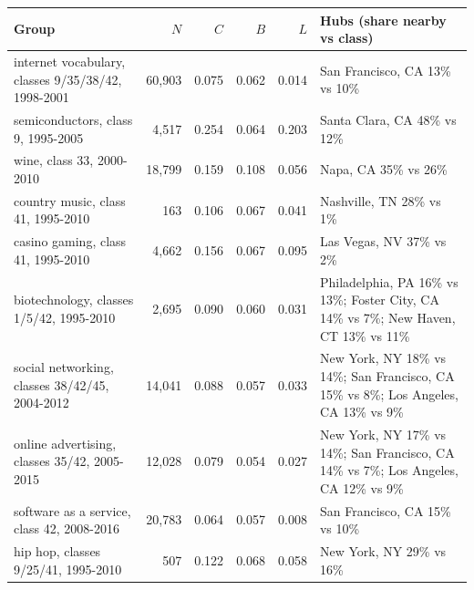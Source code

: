 {\small\begin{longtable}{>{\raggedright\arraybackslash}p{5.2cm}rrrr>{\raggedright\arraybackslash}p{4.6cm}}
\toprule Group & $N$ & $C$ & $B$ & $L$ & Hubs (share nearby vs class) \\ \midrule \endhead
internet vocabulary, classes 9/35/38/42, 1998-2001 & 60,903 & 0.075 & 0.062 & 0.014 & San Francisco, CA 13\% vs 10\% \\
semiconductors, class 9, 1995-2005 & 4,517 & 0.254 & 0.064 & 0.203 & Santa Clara, CA 48\% vs 12\% \\
wine, class 33, 2000-2010 & 18,799 & 0.159 & 0.108 & 0.056 & Napa, CA 35\% vs 26\% \\
country music, class 41, 1995-2010 & 163 & 0.106 & 0.067 & 0.041 & Nashville, TN 28\% vs 1\% \\
casino gaming, class 41, 1995-2010 & 4,662 & 0.156 & 0.067 & 0.095 & Las Vegas, NV 37\% vs 2\% \\
biotechnology, classes 1/5/42, 1995-2010 & 2,695 & 0.090 & 0.060 & 0.031 & Philadelphia, PA 16\% vs 13\%; Foster City, CA 14\% vs 7\%; New Haven, CT 13\% vs 11\% \\
social networking, classes 38/42/45, 2004-2012 & 14,041 & 0.088 & 0.057 & 0.033 & New York, NY 18\% vs 14\%; San Francisco, CA 15\% vs 8\%; Los Angeles, CA 13\% vs 9\% \\
online advertising, classes 35/42, 2005-2015 & 12,028 & 0.079 & 0.054 & 0.027 & New York, NY 17\% vs 14\%; San Francisco, CA 14\% vs 7\%; Los Angeles, CA 12\% vs 9\% \\
software as a service, class 42, 2008-2016 & 20,783 & 0.064 & 0.057 & 0.008 & San Francisco, CA 15\% vs 10\% \\
hip hop, classes 9/25/41, 1995-2010 & 507 & 0.122 & 0.068 & 0.058 & New York, NY 29\% vs 16\% \\
\bottomrule\end{longtable}}
